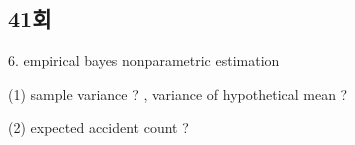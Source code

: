 \documentclass{article}
\begin{document}
\begin{CJK}{UTF8}{mj}


\section*{41회}

6. empirical bayes nonparametric estimation

(1) sample variance ? , variance of hypothetical mean ?


(2) expected accident count ?



\end{CJK}
\end{document}
